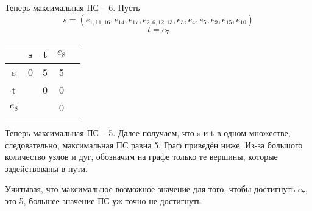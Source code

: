 \documentclass[12pt, a4paper] {ncc}
\begin{document}
Теперь максимальная ПС -- 6. Пусть
$$s = (e_{1, 11,16}, e_{14}, e_{17}, e_{2,6,12,13}, e_3, e_4, e_5, e_9, e_{15}, e_{10})$$
$$t = e_7$$

\begin{tabular}{|c|c|c|c|c|}
\hline
         & s & t & $e_8$ \\ \hline
  s      & 0 & 5 &   5   \\ \hline
  t      &   & 0 &   0   \\ \hline
$e_8$    &   &   &   0   \\ \hline
\end{tabular}

Теперь максимальная ПС -- 5. Далее получаем, что s и t в одном множестве,
следовательно, максимальная ПС равна 5. Граф приведён ниже. Из-за большого
количество узлов и дуг, обозначим на графе только те вершины, которые
задействованы в пути. \\


	Учитывая, что максимальное возможное значение для того, чтобы достигнуть $e_7$,
	это 5, большее значение ПС уж точно не достигнуть.
\end{document}

